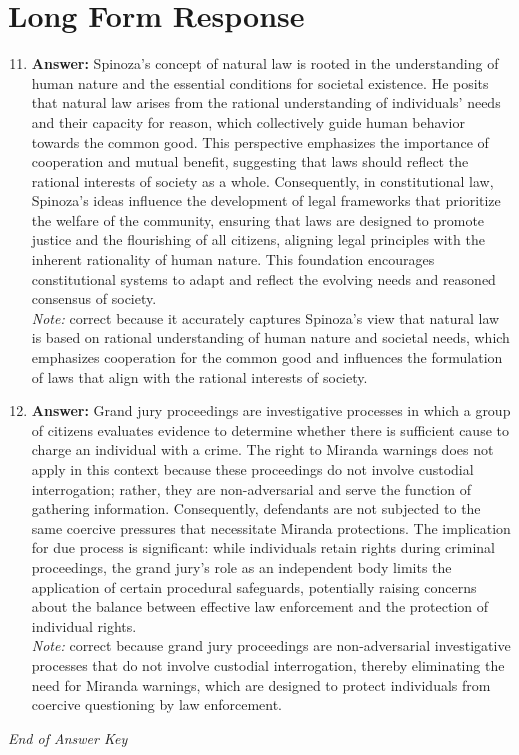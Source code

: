 \documentclass[12pt]{article}
\begin{document}
\section*{Long Form Response}
\begin{enumerate}[label=\arabic*.]
\setcounter{enumi}{10}
\item \textbf{Answer:} Spinoza's concept of natural law is rooted in the understanding of human nature and the essential conditions for societal existence. He posits that natural law arises from the rational understanding of individuals' needs and their capacity for reason, which collectively guide human behavior towards the common good. This perspective emphasizes the importance of cooperation and mutual benefit, suggesting that laws should reflect the rational interests of society as a whole. Consequently, in constitutional law, Spinoza's ideas influence the development of legal frameworks that prioritize the welfare of the community, ensuring that laws are designed to promote justice and the flourishing of all citizens, aligning legal principles with the inherent rationality of human nature. This foundation encourages constitutional systems to adapt and reflect the evolving needs and reasoned consensus of society.
\\ \textit{Note:} correct because it accurately captures Spinoza's view that natural law is based on rational understanding of human nature and societal needs, which emphasizes cooperation for the common good and influences the formulation of laws that align with the rational interests of society.
\item \textbf{Answer:} Grand jury proceedings are investigative processes in which a group of citizens evaluates evidence to determine whether there is sufficient cause to charge an individual with a crime. The right to Miranda warnings does not apply in this context because these proceedings do not involve custodial interrogation; rather, they are non-adversarial and serve the function of gathering information. Consequently, defendants are not subjected to the same coercive pressures that necessitate Miranda protections. The implication for due process is significant: while individuals retain rights during criminal proceedings, the grand jury's role as an independent body limits the application of certain procedural safeguards, potentially raising concerns about the balance between effective law enforcement and the protection of individual rights.
\\ \textit{Note:} correct because grand jury proceedings are non-adversarial investigative processes that do not involve custodial interrogation, thereby eliminating the need for Miranda warnings, which are designed to protect individuals from coercive questioning by law enforcement.
\end{enumerate}

\vfill
\noindent\textit{End of Answer Key}
\end{document}
